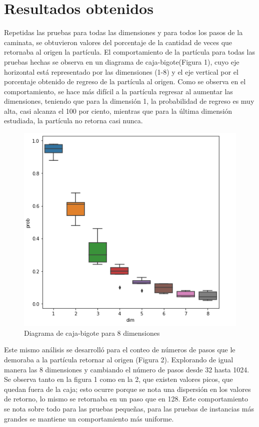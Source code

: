 \documentclass{article}
\begin{document}
     
\section{Resultados obtenidos}
Repetidas las pruebas para todas las dimensiones y para todos los pasos de la caminata, se obtuvieron valores del porcentaje de la cantidad de veces que retornaba al origen la partícula. El comportamiento de la partícula para todas las pruebas hechas se observa en un diagrama de caja-bigote(Figura 1), cuyo eje horizontal está representado por las dimensiones (1-8) y el eje vertical por el porcentaje obtenido de regreso de la partícula al origen. Como se observa en el comportamiento, se hace más difícil a la partícula regresar al  aumentar las dimensiones, teniendo que para la dimensión 1, la probabilidad de regreso es muy alta, casi alcanza el 100 por ciento, mientras que para la última dimensión estudiada, la partícula no retorna casi nunca.

\begin{figure}[H]
    \centering

    \includegraphics[scale=0.6]{Caja.png}
    \caption{Diagrama de caja-bigote para 8 dimensiones}
    \label{fig:f1}
\end{figure}

Este mismo análisis se desarrolló para el conteo de números de pasos que le demoraba a la partícula retornar al origen (Figura 2). Explorando de igual manera las 8 dimensiones y cambiando el número de pasos desde 32 hasta 1024. Se observa tanto en la figura 1 como en la 2, que existen valores picos, que quedan fuera de la caja; esto ocurre porque se nota una dispersión en los valores de retorno, lo mismo se retornaba en un paso que en 128. Este comportamiento se nota sobre todo para las pruebas pequeñas, para las pruebas de instancias más grandes se mantiene un comportamiento más uniforme.
\end{document}
